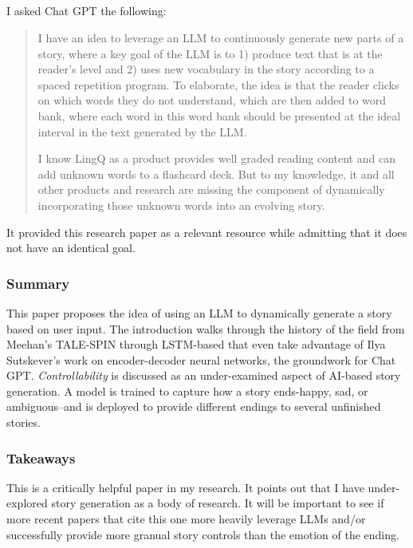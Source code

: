 \documentclass[
	letterpaper, %
]{jdf}
\begin{document}
\subsection{}
I asked Chat GPT the following:

\blockquote{I have an idea to leverage an LLM to continuously generate new parts of a story, where a key goal of the LLM is to 1) produce text that is at the reader's level and 2) uses new vocabulary in the story according to a spaced repetition program. To elaborate, the idea is that the reader clicks on which words they do not understand, which are then added to word bank, where each word in this word bank should be presented at the ideal interval in the text generated by the LLM.

I know LingQ as a product provides well graded reading content and can add unknown words to a flashcard deck. But to my knowledge, it and all other products and research are missing the component of dynamically incorporating those unknown words into an evolving story.}

It provided this research paper as a relevant resource while admitting that it does not have an identical goal.

\subsubsection{Summary}
This paper proposes the idea of using an LLM to dynamically generate a story based on user input. The introduction walks through the history of the field from Meehan's TALE-SPIN through LSTM-based that even take advantage of Ilya Sutskever's work on encoder-decoder neural networks, the groundwork for Chat GPT. \textit{Controllability} is discussed as an under-examined aspect of AI-based story generation. A model is trained to capture how a story ends-happy, sad, or ambiguous–and is deployed to provide different endings to several unfinished stories.

\subsubsection{Takeaways}
This is a critically helpful paper in my research. It points out that I have under-explored story generation as a body of research. It will be important to see if more recent papers that cite this one more heavily leverage LLMs and/or successfully provide more granual story controls than the emotion of the ending.
\end{document}

